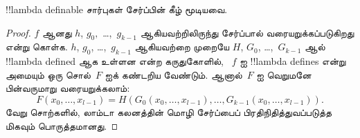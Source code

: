 \documentclass[../../../include/open-logic-section]{subfiles}
\begin{document}

\begin{lem}
!!{lambda definable} சார்புகள் சேர்ப்பின் கீழ் மூடியவை.
\end{lem}

\begin{proof}
$f$ ஆனது $h$, $g_0,$ \dots,~$g_{k-1}$ ஆகியவற்றிலிருந்து சேர்ப்பால்
வரையறுக்கப்படுகிறது என்று கொள்க. $h$, $g_0$, \dots,~$g_{k-1}$ ஆகியவற்றை
முறையே $H$, $G_0$, \dots,~$G_{k-1}$ ஆல் !!{lambda defined} ஆக உள்ளன என்ற
கருதுகோளில், ~$f$ ஐ !!{lambda define}s என்று அமையும் ஒரு சொல்~$F$ ஐக்
கண்டறிய வேண்டும். ஆனால்~$F$ ஐ
வெறுமனே பின்வருமாறு வரையறுக்கலாம்:
\[
F(x_0, \dots, x_{l-1}) = H(G_0(x_0, \dots, x_{l-1}),
\dots, G_{k-1}(x_0, \dots, x_{l-1})).
\]
வேறு சொற்களில், லாம்டா கலனத்தின் மொழி சேர்ப்பைப் பிரதிநிதித்துவப்படுத்த
மிகவும் பொருத்தமானது.
\end{proof}
\end{document}

